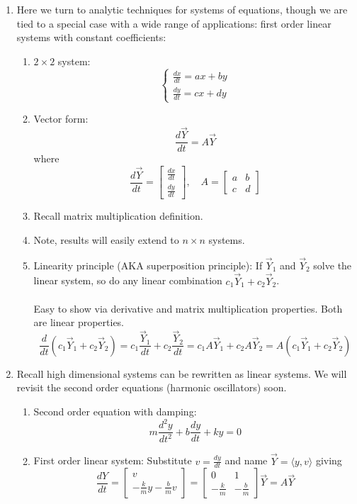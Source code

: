 \documentclass{article}
\begin{document}
\begin{enumerate}

\item Here we turn to analytic techniques for systems of equations, though we are tied to a special case with a wide range of applications: first order linear systems with constant coefficients:
\begin{enumerate}
\item $2\times 2$ system:
\[
\begin{cases}
\frac{dx}{dt} = ax+by \\
\frac{dy}{dt} = cx+dy 
\end{cases}
\]
\item Vector form:
\[
\frac{d\vec{Y}}{dt} = A \vec{Y}
\]
where 
\[
\frac{d\vec{Y}}{dt} = 
  \begin{bmatrix}
    \frac{dx}{dt} \\
    \frac{dy}{dt}
  \end{bmatrix}
, \quad
A=
  \begin{bmatrix}
    a & b \\
    c & d 
  \end{bmatrix}
\]
\item Recall matrix multiplication definition.
\item Note, results will easily extend to $n \times n$ systems.
\item Linearity principle (AKA superposition principle): If $\vec{Y}_1$ and $\vec{Y}_2$ solve the linear system, so do any linear combination $c_1\vec{Y}_1+c_2\vec{Y}_2$. \\ \ \\
Easy to show via derivative and matrix multiplication properties. Both are linear properties.
\[
\frac{d}{dt}(c_1\vec{Y}_1+c_2\vec{Y}_2) = c_1\frac{\vec{Y}_1}{dt}+c_2\frac{\vec{Y}_2}{dt} = c_1 A \vec{Y}_1 +  c_2 A \vec{Y}_2
= A ( c_1 \vec{Y}_1+ c_2 \vec{Y}_2)
\]
\end{enumerate}

\item Recall high dimensional systems can be rewritten as linear systems. We will revisit the second order equations (harmonic oscillators) soon.
\begin{enumerate}
\item Second order equation with damping:
\[
m \frac{d^2y}{dt^2} + b \frac{dy}{dt} + ky = 0
\]
\item First order linear system:
Substitute $v = \frac{dy}{dt}$ and name $\vec{Y} = \langle y, v \rangle$ giving
\[
\frac{dY}{dt}=
\begin{bmatrix}
v \\
-\frac{k}{m}y - \frac{b}{m}v
\end{bmatrix}
= \begin{bmatrix}
0 & 1 \\
-\frac{k}{m} & - \frac{b}{m} 
\end{bmatrix}
\vec{Y} = A\vec{Y}
\]
\end{enumerate}


\end{enumerate}
\end{document}
